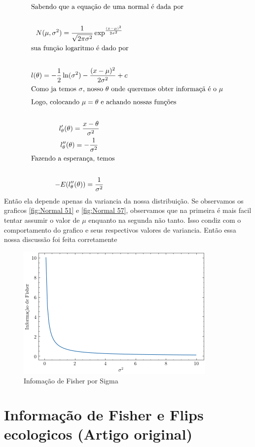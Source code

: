 \documentclass{report}[12pt]
\begin{document}
\begin{gather*}
    \intertext{Sabendo que a equação de uma normal é dada por}\\
    N(\mu,\sigma^{2} )=\frac{1}{\sqrt{2\pi \sigma ^{2}  } } \exp ^{\frac{(x-\mu )^{2}}{2\sigma ^{2} }}\\
    \intertext{sua função logaritmo é dado por} \\
    l(\theta)=-\frac{1}{2}\ln (\sigma ^{2}  )-\frac{(x-\mu )^{2}}{2\sigma ^{2} }+c\\
    \intertext{Como ja temos \(\sigma \), nosso \(\theta \) onde queremos obter informaçã é o \(\mu \) } 
    \intertext{Logo, colocando \(\mu =\theta \) e achando nossas funções} \\
    l^\prime_{\theta  }  (\theta)=\frac{x-\theta  }{\sigma^{2} }\\
    l^{\prime \prime }_{\theta} (\theta)=-\frac{1}{\sigma^{2} }\\
    \intertext{Fazendo a esperança, temos}\\
    -E(l^{\prime \prime }_{\theta } (\theta))=\frac{1}{\sigma ^{2} }\\
\end{gather*}
Então ela depende apenas da variancia da nossa distribuição. Se observamos os graficos \ref*{fig:Normal 51}
e \ref*{fig:Normal 57}, observamos que na primeira é mais facil tentar assumir o valor de \(\mu \) enquanto
na segunda não tanto. Isso condiz com o comportamento do grafico e seus respectivos valores de variancia.
Então essa nossa discussão foi feita corretamente
\begin{figure}[ht]
    \centering    
        \includegraphics[scale=0.8]{informação de fisher normal.png}
        \caption{Infomação de Fisher por Sigma}
        \label{fig:Info_fish_normal}
\end{figure}
\section{Informação de Fisher e Flips ecologicos (Artigo original)}
\end{document}
